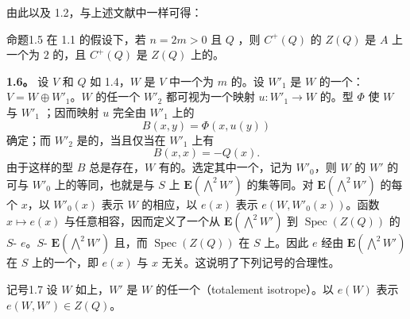 由此以及 1.2，与上述文献中一样可得：

\begin{SGAresult}{命题}{1.5}
在 1.1 的假设下，若 $n=2m>0$ 且 $Q$ ，则 $C^+(Q)$ 的 $Z(Q)$ 是 $A$ 上一个为 $2$ 的，且 $C^+(Q)$ 是 $Z(Q)$ 上的。
\end{SGAresult}

\textbf{1.6。} 设 $V$ 和 $Q$ 如 1.4，$W$ 是 $V$ 中一个为 $m$ 的。设 $W'_1$ 是 $W$ 的一个：$V=W\oplus W'_1$。$W$ 的任一个 $W'_2$ 都可视为一个映射 $u:W'_1\to W$ 的。型 $\Phi$ 使 $W$ 与 $W'_1$ ；因而映射 $u$ 完全由 $W'_1$ 上的
\[
B(x,y)=\Phi(x,u(y))
\]
确定；而 $W'_2$ 是的，当且仅当在 $W'_1$ 上有
\[
B(x,x)=-Q(x).
\]
由于这样的型 $B$ 总是存在，$W$ 有的。选定其中一个，记为 $W'_0$，则 $W$ 的 $W'$ 的可与 $W'_0$ 上的等同，也就是与 $S$ 上 $\mathbf E(\bigwedge^2W')$ 的集等同。对 $\mathbf E(\bigwedge^2W')$ 的每个 $x$，以 $W'_0(x)$ 表示 $W$ 的相应，以 $e(x)$ 表示 $e(W,W'_0(x))$。函数 $x\mapsto e(x)$ 与任意相容，因而定义了一个从 $\mathbf E(\bigwedge^2W')$ 到 $\operatorname{Spec}(Z(Q))$ 的 $S$- $e$。$S$- $\mathbf E(\bigwedge^2W')$ 且，而 $\operatorname{Spec}(Z(Q))$ 在 $S$ 上。因此 $e$ 经由 $\mathbf E(\bigwedge^2W')$ 在 $S$ 上的一个，即 $e(x)$ 与 $x$ 无关。这说明了下列记号的合理性。

\begin{SGAresult}{记号}{1.7}
设 $W$ 如上，$W'$ 是 $W$ 的任一个（totalement isotrope）。以 $e(W)$ 表示 $e(W,W')\in Z(Q)$。
\end{SGAresult}

